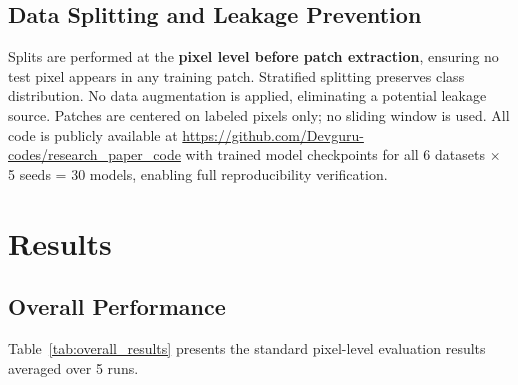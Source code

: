 \documentclass[conference]{IEEEtran}
\begin{document}
{%
\subsection{Data Splitting and Leakage Prevention}

Splits are performed at the \textbf{pixel level before patch extraction}, ensuring no test pixel appears in any training patch. Stratified splitting preserves class distribution. No data augmentation is applied, eliminating a potential leakage source. Patches are centered on labeled pixels only; no sliding window is used. All code is publicly available at \url{https://github.com/Devguru-codes/research_paper_code} with trained model checkpoints for all 6 datasets $\times$ 5 seeds = 30 models, enabling full reproducibility verification.

\section{Results}

\subsection{Overall Performance}

Table~\ref{tab:overall_results} presents the standard pixel-level evaluation results averaged over 5 runs.

}
\end{document}

